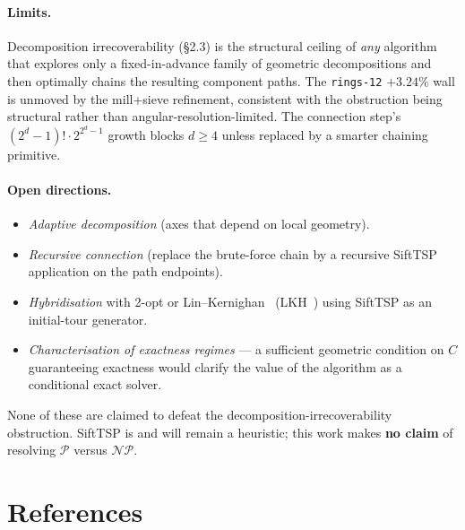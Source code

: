 \documentclass[11pt,a4paper]{article}
\begin{document}
\paragraph{Limits.} Decomposition irrecoverability (\S2.3) is the
structural ceiling of \emph{any} algorithm that explores only a
fixed-in-advance family of geometric decompositions and then optimally
chains the resulting component paths. The \texttt{rings-12} $+3.24\%$
wall is unmoved by the mill+sieve refinement, consistent with the
obstruction being structural rather than angular-resolution-limited.
The connection step's $(2^d - 1)! \cdot 2^{2^d - 1}$ growth blocks
$d \geq 4$ unless replaced by a smarter chaining primitive.

\paragraph{Open directions.}
\begin{itemize}
\item \emph{Adaptive decomposition} (axes that depend on local
geometry).
\item \emph{Recursive connection} (replace the brute-force chain by a
recursive SiftTSP application on the path endpoints).
\item \emph{Hybridisation} with 2-opt or Lin--Kernighan~\cite{linkernighan1973}
(LKH~\cite{helsgaun2000}) using SiftTSP as an initial-tour generator.
\item \emph{Characterisation of exactness regimes} --- a sufficient
geometric condition on $C$ guaranteeing exactness would clarify the
value of the algorithm as a conditional exact solver.
\end{itemize}

None of these are claimed to defeat the decomposition-irrecoverability
obstruction. SiftTSP is and will remain a heuristic; this work makes
\textbf{no claim} of resolving $\mathcal{P}$ versus $\mathcal{NP}$.

\section*{References}
\end{document}
